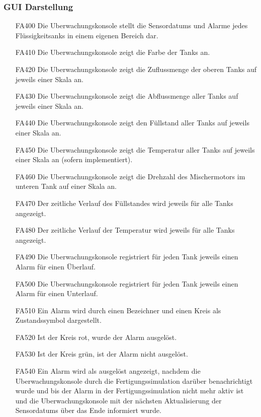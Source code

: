 \documentclass[parskip=full]{scrartcl}
\begin{document}
\subsubsection{GUI Darstellung}
\begin{enumerate}
  \item[FA400] Die \gls{Uberwachungskonsole} stellt die \glspl{Sensordatum} und Alarme jedes Flüssigkeitsanks in einem eigenen Bereich dar.
  \item[FA410] Die \gls{Uberwachungskonsole} zeigt die Farbe der Tanks an.
  \item[FA420] Die \gls{Uberwachungskonsole} zeigt die Zuflussmenge der oberen Tanks auf jeweils einer Skala an.
  \item[FA430] Die \gls{Uberwachungskonsole} zeigt die Abflussmenge aller Tanks auf jeweils einer Skala an.
  \item[FA440] Die \gls{Uberwachungskonsole} zeigt den Füllstand aller Tanks auf jeweils einer Skala an.
  \item[FA450] Die \gls{Uberwachungskonsole} zeigt die Temperatur aller Tanks auf jeweils einer Skala an (sofern implementiert).
  \item[FA460] Die \gls{Uberwachungskonsole} zeigt die Drehzahl des Mischermotors im unteren Tank auf einer Skala an.
  \item[FA470] Der zeitliche Verlauf des Füllstandes wird jeweils für alle Tanks angezeigt.
  \item[FA480] Der zeitliche Verlauf der Temperatur wird jeweils für alle Tanks angezeigt.
  \item[FA490] Die \gls{Uberwachungskonsole} registriert für jeden Tank jeweils einen Alarm für einen Überlauf.
  \item[FA500] Die \gls{Uberwachungskonsole} registriert für jeden Tank jeweils einen Alarm für einen Unterlauf.
  \item[FA510] Ein Alarm wird durch einen Bezeichner und einen Kreis als Zustandssymbol dargestellt.
  \item[FA520] Ist der Kreis rot, wurde der Alarm ausgelöst.
  \item[FA530] Ist der Kreis grün, ist der Alarm nicht ausgelöst.
  \item[FA540] Ein Alarm wird als ausgelöst angezeigt, nachdem die \gls{Uberwachungskonsole} durch die \gls{Fertigungssimulation} darüber benachrichtigt wurde und bis der Alarm in der
    \gls{Fertigungssimulation} nicht mehr aktiv ist und die \gls{Uberwachungskonsole} mit der nächsten Aktualisierung der \glspl{Sensordatum} über das Ende informiert wurde.

\end{enumerate}
\end{document}
